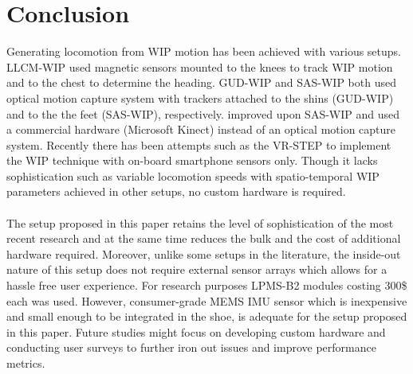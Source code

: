 
\chapter{Conclusion} %

\label{Chapter4} %


Generating locomotion from WIP motion has been achieved with various setups. LLCM-WIP \citep{Fea08} used magnetic sensors mounted to the knees to track WIP motion and to the chest to determine the heading. GUD-WIP \citep{Wen10} and SAS-WIP \citep{Bru13} both used optical motion capture system with trackers attached to the shins (GUD-WIP) and to the the feet (SAS-WIP), respectively. \cite{Bru17} improved upon SAS-WIP and used a commercial hardware (Microsoft Kinect) instead of an optical motion capture system. Recently there has been attempts such as the VR-STEP \citep{Tre16} to implement the WIP technique with on-board smartphone sensors only. Though it lacks sophistication such as variable locomotion speeds with spatio-temporal WIP parameters achieved in other setups, no custom hardware is required. 
\\\\
The setup proposed in this paper retains the level of sophistication of the most recent research and at the same time reduces the bulk and the cost of additional hardware required. Moreover, unlike some setups in the literature, the inside-out nature of this setup does not require external sensor arrays which allows for a hassle free user experience. For research purposes LPMS-B2 modules costing 300\$ each was used. However, consumer-grade MEMS IMU sensor which is inexpensive and small enough to be integrated in the shoe, is adequate for the setup proposed in this paper. Future studies might focus on developing custom hardware and conducting user surveys to further iron out issues and improve performance metrics.